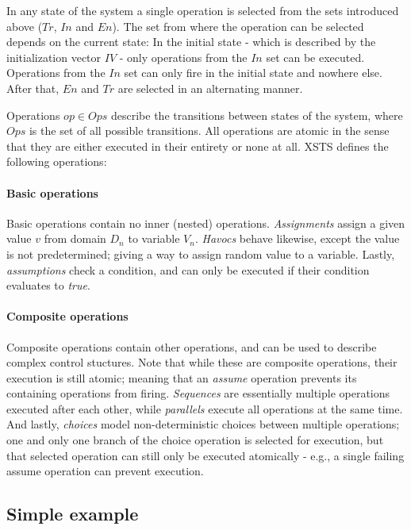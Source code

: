 In any state of the system a single operation is selected from the sets introduced above (\(Tr\), \(In\) and \(En\)). The set from where the operation can be selected depends on the current state: In the initial state - which is described by the initialization vector \(IV\) - only operations from the \(In\) set can be executed. Operations from the \(In\) set can only fire in the initial state and nowhere else. After that, \(En\) and \(Tr\) are selected in an alternating manner.

Operations \(op \in Ops\) describe the transitions between states of the system, where \(Ops\) is the set of all possible transitions. All operations are atomic in the sense that they are either executed in their entirety or none at all. XSTS defines the following operations:

\paragraph{Basic operations}

Basic operations contain no inner (nested) operations. \emph{Assignments} assign a given value \(v\) from domain \(D_n\) to variable \(V_n\). \emph{Havocs} behave likewise, except the value is not predetermined; giving a way to assign random value to a variable. Lastly, \emph{assumptions} check a condition, and can only be executed if their condition evaluates to \emph{true}.

\paragraph{Composite operations}

Composite operations contain other operations, and can be used to describe complex control stuctures. Note that while these are composite operations, their execution is still atomic; meaning that an \emph{assume} operation prevents its containing operations from firing. \emph{Sequences} are essentially multiple operations executed after each other, while \emph{parallels} execute all operations at the same time. And lastly, \emph{choices} model non-deterministic choices between multiple operations; one and only one branch of the choice operation is selected for execution, but that selected operation can still only be executed atomically - e.g., a single failing assume operation can prevent execution.

\subsection{Simple example}

